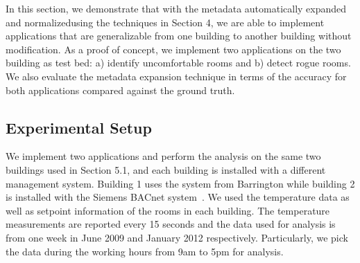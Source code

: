 In this section, we demonstrate that with the metadata automatically expanded and normalizedusing the techniques in Section 4, we are able to implement applications that are generalizable from one building to another building without modification. As a proof of concept, we implement two applications on the two building as test bed: a) identify uncomfortable rooms and b) detect rogue rooms. We also evaluate the metadata expansion technique in terms of the accuracy for both applications compared against the ground truth. 

\subsection{Experimental Setup}
We implement two applications and perform the analysis on the same two buildings used in Section 5.1, and each building is installed with a different management system. Building 1 uses the system from Barrington while building 2 is installed with the Siemens BACnet system~\cite{bacnet}. We used the temperature data as well as setpoint information of the rooms in each building. The temperature measurements are reported every 15 seconds and the data used for analysis is from one week in June 2009 and January 2012 respectively. Particularly, we pick the data during the working hours from 9am to 5pm for analysis.

